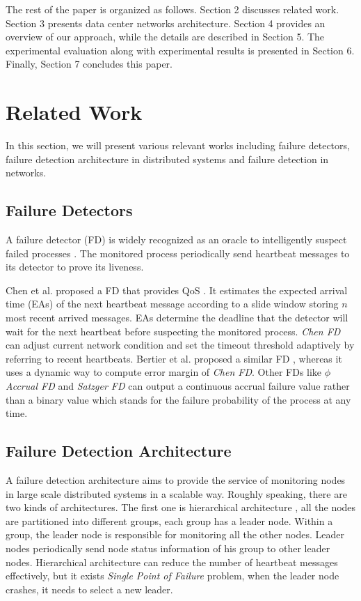 \documentclass{sig-alternate-05-2015}
\begin{document}
The rest of the paper is organized as follows. Section 2 discusses related work. Section 3 presents data center networks architecture. Section 4 provides an overview of our approach, while the details are described in Section 5. The experimental evaluation along with experimental results is presented in Section 6. Finally, Section 7 concludes this paper.

\section{Related Work}
In this section, we will present various relevant works including failure detectors, failure detection architecture in distributed systems and failure detection in networks.

\subsection{Failure Detectors}
A failure detector (FD) is widely recognized as an oracle to intelligently suspect failed processes \cite{chandra1996unreliable}. The monitored process periodically send heartbeat messages to its detector to prove its liveness.

Chen et al. proposed a FD that provides QoS \cite{chen2002quality}. It estimates the expected arrival time (EAs) of the next heartbeat message according to a slide window storing $n$ most recent arrived messages. EAs determine the deadline that the detector will wait for the next heartbeat before suspecting the monitored process. \textit{Chen FD} can adjust current network condition and set the timeout threshold adaptively by referring to recent heartbeats. Bertier et al. proposed a similar FD \cite{bertier2002implementation}, whereas it uses a dynamic way to compute error margin of \textit{Chen FD}. Other FDs like \textit{$\phi$ Accrual FD} \cite{hayashibara2004varphi} and \textit{Satzger FD} \cite{satzger2007new} can output a continuous accrual failure value rather than a binary value which stands for the failure probability of the process at any time.

\subsection{Failure Detection Architecture}
A failure detection architecture aims to provide the service of monitoring nodes in large scale distributed systems in a scalable way.
Roughly speaking, there are two kinds of architectures. The first one is hierarchical architecture \cite{felber1999failure}, all the nodes are partitioned into different groups, each group has a leader node. Within a group, the leader node is responsible for monitoring all the other nodes. Leader nodes periodically send node status information of his group to other leader nodes. Hierarchical architecture can reduce the number of heartbeat messages effectively, but it exists \textit{Single Point of Failure} problem, when the leader node crashes, it needs to select a new leader.
\end{document}
